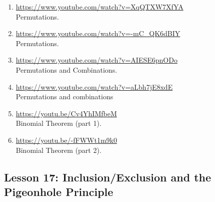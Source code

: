 \documentclass[11pt]{amsart}
\begin{document}
\begin{enumerate}

\item \url{https://www.youtube.com/watch?v=XqQTXW7XfYA}\\
Permutations.\\[5pt]


\item \url{https://www.youtube.com/watch?v=-mC_QK6dBIY}\\
Permutations.\\[5pt]


\item \url{https://www.youtube.com/watch?v=AIESE6pnODo}\\
Permutations and Combinations.\\[5pt]


\item \url{https://www.youtube.com/watch?v=aLbh7jE8xdE}\\
Permutations and combinations\\[5pt]


\item \url{https://youtu.be/Cv4YhIMfbeM}\\
Binomial Theorem (part 1).\\[5pt]


\item \url{https://youtu.be/-fFWWt1m9k0}\\
Binomial Theorem (part 2).\\[5pt]



\end{enumerate}

\subsection{Lesson 17: Inclusion/Exclusion and the  Pigeonhole Principle}
\end{document}
